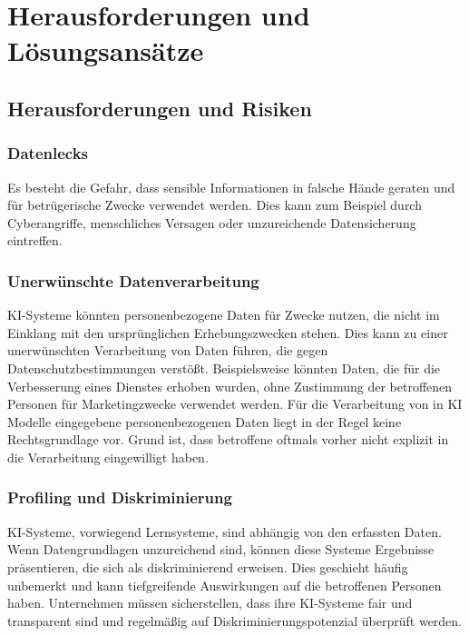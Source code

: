 \chapter{Herausforderungen und Lösungsansätze}

\section{Herausforderungen und Risiken}

\subsection{Datenlecks}

Es besteht die Gefahr, dass sensible Informationen in falsche Hände geraten und
für betrügerische Zwecke verwendet werden. Dies kann zum Beispiel durch
Cyberangriffe, menschliches Versagen oder unzureichende Datensicherung
eintreffen.

\cite{digitalesinstitut2024}

\subsection{Unerwünschte Datenverarbeitung}

KI-Systeme könnten personenbezogene Daten für Zwecke nutzen, die nicht im
Einklang mit den ursprünglichen Erhebungszwecken stehen. Dies kann zu einer
unerwünschten Verarbeitung von Daten führen, die gegen Datenschutzbestimmungen
verstößt. Beispielsweise könnten Daten, die für die Verbesserung eines Dienstes
erhoben wurden, ohne Zustimmung der betroffenen Personen für Marketingzwecke
verwendet werden. Für die Verarbeitung von in KI Modelle eingegebene
personenbezogenen Daten liegt in der Regel keine Rechtsgrundlage vor. Grund ist,
dass betroffene oftmals vorher nicht explizit in die Verarbeitung eingewilligt
haben. 

\cite{digitalesinstitut2024}


\subsection{Profiling und Diskriminierung}

KI-Systeme, vorwiegend Lernsysteme, sind abhängig von den erfassten Daten. Wenn
Datengrundlagen unzureichend sind, können diese Systeme Ergebnisse präsentieren,
die sich als diskriminierend erweisen. Dies geschieht häufig unbemerkt und kann
tiefgreifende Auswirkungen auf die betroffenen Personen haben. Unternehmen
müssen sicherstellen, dass ihre KI-Systeme fair und transparent sind und
regelmäßig auf Diskriminierungspotenzial überprüft werden.

